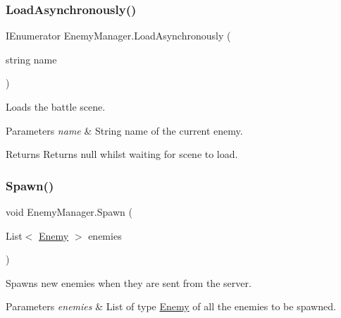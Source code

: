 \subsubsection{\texorpdfstring{LoadAsynchronously()}{LoadAsynchronously()}}
{\footnotesize\ttfamily I\+Enumerator Enemy\+Manager.\+Load\+Asynchronously (\begin{DoxyParamCaption}\item[{string}]{name }\end{DoxyParamCaption})\hspace{0.3cm}{\ttfamily [private]}}



Loads the battle scene. 


\begin{DoxyParams}{Parameters}
{\em name} & String name of the current enemy.\\
\hline
\end{DoxyParams}
\begin{DoxyReturn}{Returns}
Returns null whilst waiting for scene to load.
\end{DoxyReturn}
\mbox{\label{class_enemy_manager_a0c3680c45bec759982150be5c613dd88}} 
\subsubsection{\texorpdfstring{Spawn()}{Spawn()}}
{\footnotesize\ttfamily void Enemy\+Manager.\+Spawn (\begin{DoxyParamCaption}\item[{List$<$ \mbox{\hyperlink{class_enemy}{Enemy}} $>$}]{enemies }\end{DoxyParamCaption})\hspace{0.3cm}{\ttfamily [private]}}



Spawns new enemies when they are sent from the server. 


\begin{DoxyParams}{Parameters}
{\em enemies} & List of type \mbox{\hyperlink{class_enemy}{Enemy}} of all the enemies to be spawned.\\
\hline
\end{DoxyParams}
\mbox{\label{class_enemy_manager_afcf3de6b6a3f197fe343fc43592b46d5}} 
